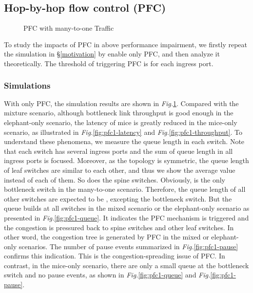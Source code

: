 \documentclass[]{sig-alternate-10pt}
\begin{document}
\subsection{Hop-by-hop flow control (PFC)}
\begin{figure}[t]
	\centering
	\hfill
	\caption{PFC with many-to-one Traffic}
	\label{fig:pfc1}
\end{figure}


To study the impacts of PFC in above performance impairment, we firstly repeat the simulation in \S\ref{motivation} by enable only PFC, and then analyze it theoretically. The threshold of triggering PFC is  for each ingress port.

\subsubsection{Simulations}
With only PFC, the simulation results are shown in \emph{Fig.}\ref{fig:pfc1}. Compared with the mixture scenario, although bottleneck link throughput is good enough in the elephant-only scenario, the latency of mice is greatly reduced in the mice-only scenario, as illustrated in \emph{Fig.}\ref{fig:pfc1-latency} and \emph{Fig.}\ref{fig:pfc1-throughput}.
To understand these phenomena, we measure the queue length in each switch.
Note that each switch has several ingress ports and the sum of queue length in all ingress ports is focused.
Moreover, as the topology is symmetric, the queue length of leaf switches are similar to each other, and thus we show the average value instead of each of them. So does the spine switches.
Obviously,  is the only bottleneck switch in the many-to-one scenario. Therefore, the queue length of all other switches are expected to be , excepting the bottleneck switch.
But the queue builds at all switches in the mixed scenario or the elephant-only scenario as presented in \emph{Fig.}\ref{fig:pfc1-queue}.
It indicates the PFC mechanism is triggered and the congestion is pressured back to spine switches and other leaf switches. In other word, the congestion tree is generated by PFC in the mixed or elephant-only scenarios.
The number of pause events summarized in \emph{Fig.}\ref{fig:pfc1-pause} confirms this indication.
This is the congestion-spreading issue of PFC.
In contrast, in the mice-only scenario, there are only a small queue at the bottleneck switch and no pause events, as shown in \emph{Fig.}\ref{fig:pfc1-queue} and \emph{Fig.}\ref{fig:pfc1-pause}.
\end{document}
